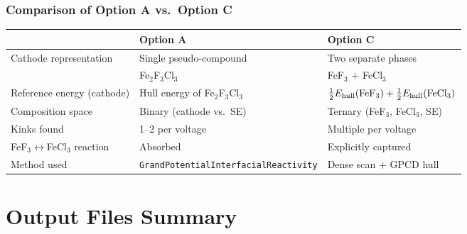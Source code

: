 \documentclass[11pt,letterpaper]{article}
\begin{document}
\subsubsection{Comparison of Option A vs.\ Option C}

\begin{center}
\begin{tabular}{lll}
\toprule
                         & \textbf{Option A}             & \textbf{Option C} \\
\midrule
Cathode representation   & Single pseudo-compound        & Two separate phases \\
                         & Fe$_2$F$_3$Cl$_3$                 & FeF$_3$ + FeCl$_3$ \\
Reference energy (cathode) & Hull energy of Fe$_2$F$_3$Cl$_3$ & $\frac{1}{2}E_{\rm hull}(\text{FeF}_3)
                                                            +\frac{1}{2}E_{\rm hull}(\text{FeCl}_3)$ \\
Composition space        & Binary (cathode vs.\ SE)      & Ternary (FeF$_3$, FeCl$_3$, SE) \\
Kinks found              & 1--2 per voltage              & Multiple per voltage \\
FeF$_3\leftrightarrow$FeCl$_3$ reaction & Absorbed & Explicitly captured \\
Method used              & \texttt{GrandPotentialInterfacialReactivity} & Dense scan + GPCD hull \\
\bottomrule
\end{tabular}
\end{center}

\section{Output Files Summary}
\end{document}
